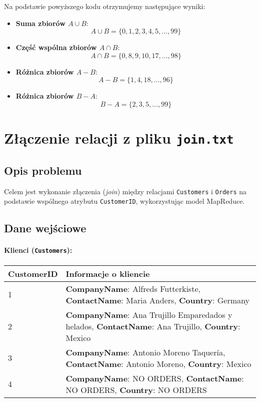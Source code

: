 \documentclass{article}
\begin{document}
Na podstawie powyższego kodu otrzymujemy następujące wyniki:

\begin{itemize}
    \item \textbf{Suma zbiorów \(A \cup B\)}:
    \[
    A \cup B = \{0, 1, 2, 3, 4, 5, \dots, 99\}
    \]
    \item \textbf{Część wspólna zbiorów \(A \cap B\)}:
    \[
    A \cap B = \{0, 8, 9, 10, 17, \dots, 98\}
    \]
    \item \textbf{Różnica zbiorów \(A - B\)}:
    \[
    A - B = \{1, 4, 18, \dots, 96\}
    \]
    \item \textbf{Różnica zbiorów \(B - A\)}:
    \[
    B - A = \{2, 3, 5, \dots, 99\}
    \]
\end{itemize}

\section{Złączenie relacji z pliku \texttt{join.txt}}

\subsection{Opis problemu}

Celem jest wykonanie złączenia (\emph{join}) między relacjami \texttt{Customers} i \texttt{Orders} na podstawie wspólnego atrybutu \texttt{CustomerID}, wykorzystując model MapReduce.

\subsection{Dane wejściowe}

\paragraph{Klienci (\texttt{Customers}):} 
\paragraph{}

\begin{table}[H]
\begin{tabular}{l p{10cm}}
\textbf{CustomerID} & \textbf{Informacje o kliencie} \\
\hline
1 & \textbf{CompanyName}: Alfreds Futterkiste, \textbf{ContactName}: Maria Anders, \textbf{Country}: Germany \\
2 & \textbf{CompanyName}: Ana Trujillo Emparedados y helados, \textbf{ContactName}: Ana Trujillo, \textbf{Country}: Mexico \\
3 & \textbf{CompanyName}: Antonio Moreno Taquería, \textbf{ContactName}: Antonio Moreno, \textbf{Country}: Mexico \\
4 & \textbf{CompanyName}: NO ORDERS, \textbf{ContactName}: NO ORDERS, \textbf{Country}: NO ORDERS \\
\end{tabular}
\end{table}
\end{document}

